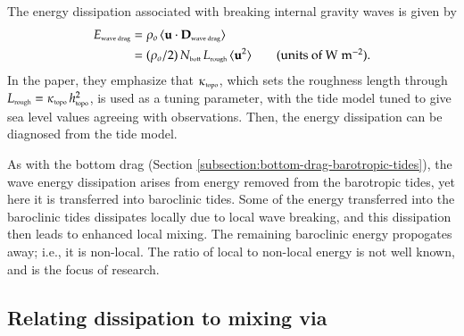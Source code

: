 The energy dissipation associated with breaking internal gravity waves
is given by
\begin{equation}
\begin{split}
 E_{\mbox{\tiny wave drag}} &=
  \rho_{o} \, \langle {\bf u} \cdot {\bf D}_{\mbox{\tiny wave drag}} \rangle 
 \\
 &=
   (\rho_{o}/2) \, N_{\mbox{\tiny bott}}  \,  L_{\mbox{\tiny rough}}
   \,  \langle {\bf u}^{2} \rangle  
 \qquad \mbox{(units of $\mbox{W} \; \mbox{m}^{-2}$).}
\end{split}
\label{eq:wave-energy-flux}
\end{equation}
In the \cite{Jayne_etal2001} paper, they emphasize that
$\kappa_{\mbox{\tiny topo}}$, which sets the roughness length through
$L_{\mbox{\tiny rough}} = \kappa_{\mbox{\tiny topo}} \, h_{\mbox{\tiny
    topo}}^{2}$, is used as a tuning parameter, with the tide model
tuned to give sea level values agreeing with observations.  Then, the
energy dissipation can be diagnosed from the tide model.

As with the bottom drag (Section
\ref{subsection:bottom-drag-barotropic-tides}), the wave energy
dissipation arises from energy removed from the barotropic tides, yet
here it is transferred into baroclinic tides.  Some of the energy
transferred into the baroclinic tides dissipates locally due to local
wave breaking, and this dissipation then leads to enhanced local
mixing.  The remaining baroclinic energy propogates away; i.e., it is
non-local.  The ratio of local to non-local energy is not well known,
and is the focus of research.


\subsection{Relating dissipation to mixing via \cite{Osborn1980}}

